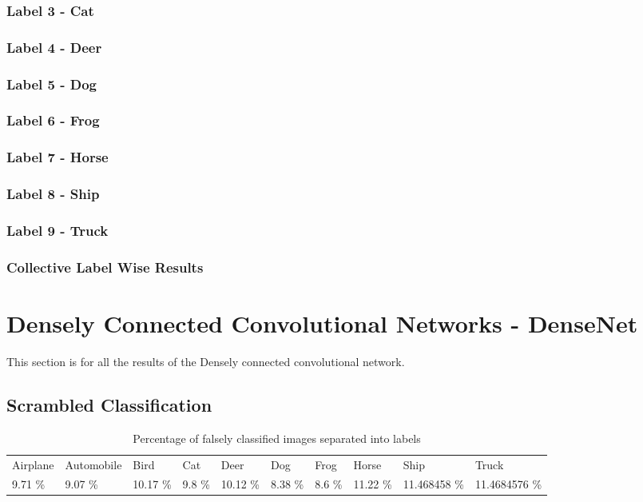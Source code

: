 \subsubsection{Label 3 - Cat}
\subsubsection{Label 4 - Deer}
\subsubsection{Label 5 - Dog}
\subsubsection{Label 6 - Frog}
\subsubsection{Label 7 - Horse}
\subsubsection{Label 8 - Ship}
\subsubsection{Label 9 - Truck}
\subsubsection{Collective Label Wise Results}

\section{Densely Connected Convolutional Networks - DenseNet}
This section is for all the results of the Densely connected convolutional network.

\subsection{Scrambled Classification}

\FloatBarrier

\begin{table}[]
	\centering
	\caption{Percentage of falsely classified images separated into labels }
	\label{table:falseclas}
	\begin{tabular}{llllllllll}
		Airplane & Automobile & Bird     & Cat    & Deer     & Dog     & Frog   & Horse    & Ship         & Truck         \\
		9.71 \%  & 9.07 \%    & 10.17 \% & 9.8 \% & 10.12 \% & 8.38 \% & 8.6 \% & 11.22 \% & 11.468458 \% & 11.4684576 \%
	\end{tabular}
\end{table}
\FloatBarrier
